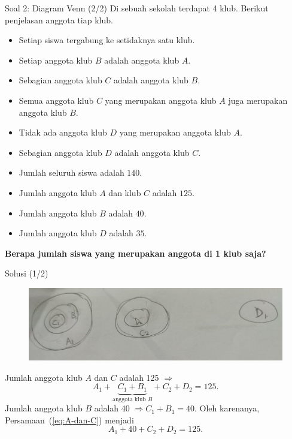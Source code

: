 \documentclass[english,t]{beamer}
\begin{document}
\begin{frame}{Soal 2: Diagram Venn (2/2)}   
Di sebuah sekolah terdapat 4 klub. Berikut penjelasan anggota tiap klub.
\begin{itemize}
	\item Setiap siswa tergabung ke setidaknya satu klub.
	\item Setiap anggota klub $B$ adalah anggota klub $A$.
	\item Sebagian anggota klub $C$ adalah anggota klub $B$.
	\item Semua anggota klub $C$ yang merupakan anggota klub $A$ juga merupakan anggota klub $B$.
	\item Tidak ada anggota klub $D$ yang merupakan anggota klub $A$.
	\item Sebagian anggota klub $D$ adalah anggota klub $C$.
	\item Jumlah seluruh siswa adalah $140$.
	\item Jumlah anggota klub $A$ dan klub $C$ adalah $125$.
	\item Jumlah anggota klub $B$ adalah $40$.
	\item Jumlah anggota klub $D$ adalah $35$.
\end{itemize}
 \textbf{Berapa jumlah siswa yang merupakan anggota di 1 klub saja?}
\end{frame}

\begin{frame}{Solusi (1/2)}
	\begin{figure}[!ht]
		\centering
		\includegraphics[scale=0.2]{images/solusi-soal-2}		
	\end{figure}
	Jumlah anggota klub $A$ dan $C$ adalah 125 $\Rightarrow$
	\begin{equation}
		A_1 + \underbrace{C_1 + B_1}_{\text{anggota klub }B} + C_2 + D_2 = 125.
		\label{eq:A-dan-C}
	\end{equation}
	Jumlah anggota klub $B$ adalah 40 $\Rightarrow C_1 + B_1 = 40$. Oleh karenanya, Persamaan~(\ref{eq:A-dan-C}) menjadi 	
	\begin{equation}
		A_1 + 40 + C_2 + D_2 = 125.
		\label{eq:A-B-dan-C}
	\end{equation}
\end{frame}
\end{document}

